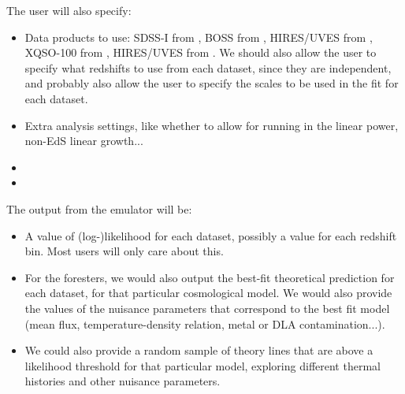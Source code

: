 The user will also specify:
\begin{itemize}
 \item Data products to use: 
  SDSS-I from \cite{McDonald2006}, 
  BOSS from \cite{Palanque-Delabrouille2013},
  HIRES/UVES from \cite{Viel2013},
  XQSO-100 from \cite{Irsic2017}, 
  HIRES/UVES from \cite{Walther2018a}. 
  We should also allow the user to specify what redshifts to use from each
  dataset, since they are independent, and probably also allow the user 
  to specify the scales to be used in the fit for each dataset.
 \item Extra analysis settings, like whether to allow for running in the 
  linear power, non-EdS linear growth...
 \item {}
 \item {}
\end{itemize}

The output from the emulator will be:
\begin{itemize}
 \item A value of (log-)likelihood for each dataset, possibly a value for 
  each redshift bin. 
  Most users will only care about this.
 \item For the foresters, we would also output the best-fit theoretical 
  prediction for each dataset, for that particular cosmological model.
  We would also provide the values of the nuisance parameters that correspond
  to the best fit model (mean flux, temperature-density relation, metal or DLA
  contamination...).
 \item We could also provide a random sample of theory lines that are above a 
  likelihood threshold for that particular model, exploring different 
  thermal histories and other nuisance parameters.
\end{itemize}


